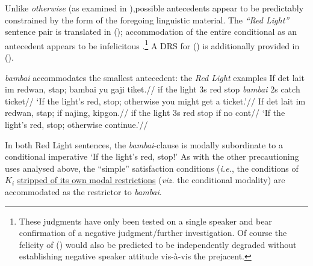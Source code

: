 \xe





Unlike \textit{otherwise} (as examined in \citealp{PhilKotek}),possible antecedents appear to be predictably constrained by the form of the foregoing linguistic material. The \textit{``Red Light''} sentence pair is translated in (\nextx); accommodation of the entire conditional as an antecedent appears to be infelicitous \citep[\textit{cf.}][]{PhilKotek,Webber2003,Kruijff-Korbayova2001}.\footnote{These judgments have only been tested on a single speaker and bear confirmation of a negative judgment/further investigation. Of course the felicity of () would also be predicted to be independently degraded without establishing negative speaker attitude vis-à-vis the prejacent.} A DRS for () is additionally provided in ().


	\pex \textit{bambai} accommodates the smallest antecedent: the \textit{Red Light} examples 
\a\begingl
\gla If det lait im redwan, stap; bambai yu gaji tiket.//
\glb if the light 3s red stop \textit{bambai} 2s catch ticket//
\glft`If the light's red, stop; otherwise you might get a ticket.'//
\endgl
\a\begingl\gla	If det lait im redwan, stap; if najing, kipgon.//
\glb if the light 3s red stop if no {\sc cont}//
\glft`If the light's red, stop; otherwise continue.'\trailingcitation{[GT~19032017]}//
\endgl\xe
{}

In both Red Light sentences, the \textit{bambai}-clause is modally subordinate to a conditional imperative `If the light's red, stop!' As with the other precautioning uses analysed above, the ``simple'' satisfaction conditions (\textit{i.e.}, the conditions of $ K_i $ \ul{stripped of its own modal restrictions} (\textit{viz.} the conditional modality)
 are accommodated as the restrictor to \textit{bambai}.%

